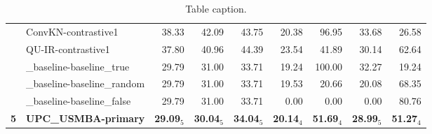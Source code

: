 \begin{table*}[tbh]
\begin{center}
\begin{tabular}{clrrrrrrr}
& ConvKN-contrastive1 & 38.33 & \scriptsize 42.09 & \scriptsize 43.75 & \scriptsize 20.38 & \scriptsize 96.95 & \scriptsize 33.68 & \scriptsize 26.58 \\
& QU-IR-contrastive1 & 37.80 & \scriptsize 40.96 & \scriptsize 44.39 & \scriptsize 23.54 & \scriptsize 41.89 & \scriptsize 30.14 & \scriptsize 62.64 \\
& \_baseline-baseline\_true & 29.79 & \scriptsize 31.00 & \scriptsize 33.71 & \scriptsize 19.24 & \scriptsize 100.00 & \scriptsize 32.27 & \scriptsize 19.24 \\
& \_baseline-baseline\_random & 29.79 & \scriptsize 31.00 & \scriptsize 33.71 & \scriptsize 19.53 & \scriptsize 20.66 & \scriptsize 20.08 & \scriptsize 68.35 \\
& \_baseline-baseline\_false & 29.79 & \scriptsize 31.00 & \scriptsize 33.71 & \scriptsize  0.00 & \scriptsize  0.00 & \scriptsize  0.00 & \scriptsize 80.76 \\
\bf 5 & \bf UPC\_USMBA-primary & \bf 29.09$_{5}$ & \bf \scriptsize 30.04$_{5}$ & \bf \scriptsize 34.04$_{5}$ & \bf \scriptsize 20.14$_{4}$ & \bf \scriptsize 51.69$_{4}$ & \bf \scriptsize 28.99$_{5}$ & \bf \scriptsize 51.27$_{4}$ \\
\end{tabular}
\caption{Table caption.}
\label{table:results}
\end{center}
\end{table*}
